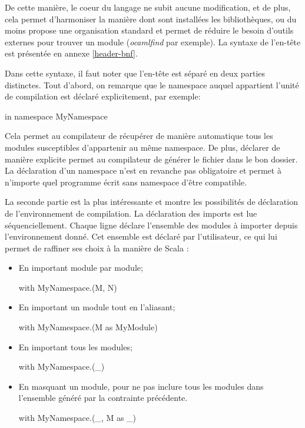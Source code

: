 \documentclass[11pt,a4paper]{report}
\begin{document}
De cette manière, le coeur du langage ne subit aucune modification, et de plus,
cela permet d'harmoniser la manière dont sont installées les bibliothèques, ou du
moins propose une organisation standard et permet de réduire le besoin d'outils
externes pour trouver un module (\emph{ocamlfind} par exemple). La syntaxe de
l'en-tête est présentée en annexe \ref{header-bnf}.


Dans cette syntaxe, il faut noter que l'en-tête est séparé en deux parties
distinctes. Tout d'abord, on remarque que le namespace auquel appartient l'unité
de compilation est déclaré explicitement, par exemple:
\begin{OCaml}
in namespace MyNamespace
\end{OCaml}
Cela permet au compilateur de récupérer de manière automatique tous les modules
susceptibles d'appartenir au même namespace. De plus, déclarer de manière
explicite permet au compilateur de générer le fichier dans le bon dossier. La
déclaration d'un namespace n'est en revanche pas obligatoire et permet à
n'importe quel programme écrit sans namespace d'être compatible.

La seconde partie est la plus intéressante et montre les possibilités de
déclaration de l'environnement de compilation. La déclaration des imports est
lue séquenciellement. Chaque ligne déclare l'ensemble des modules à importer
depuis l'environnement donné. Cet ensemble est déclaré par l'utilisateur, ce qui
lui permet de raffiner ses choix à la manière de Scala :
\begin{itemize}
\item En important module par module;
\begin{OCaml}
with MyNamespace.(M, N)
\end{OCaml}
\item En important un module tout en l'aliasant;
\begin{OCaml}
with MyNamespace.(M as MyModule) 
\end{OCaml}
\item En important tous les modules;
\begin{OCaml}
with MyNamespace.(_)
\end{OCaml}
\item En masquant un module, pour ne pas inclure tous les modules dans
  l'ensemble généré par la contrainte précédente.
\begin{OCaml}
with MyNamespace.(_, M as _)
\end{OCaml}
\end{itemize}
\end{document}
